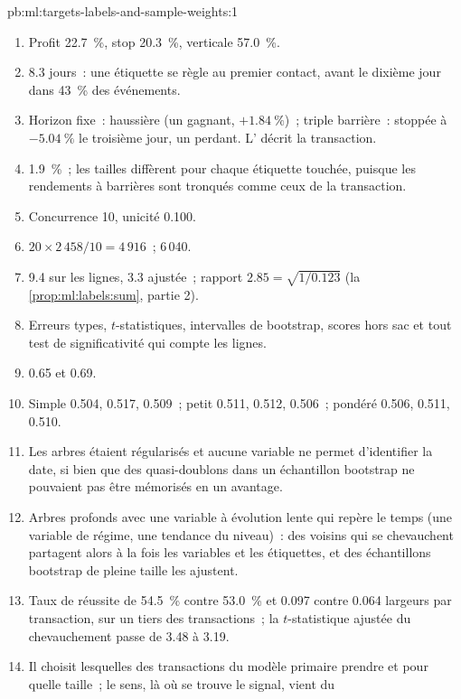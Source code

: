 \begin{solution}{pb:ml:targets-labels-and-sample-weights:1}
\begin{enumerate}
\item Profit 22.7~\%, stop 20.3~\%, verticale 57.0~\%.
\item 8.3 jours~: une étiquette se règle au premier contact, avant le dixième jour dans 43~\% des événements.
\item Horizon fixe~: haussière (un gagnant, $+1.84~\%$)~; triple barrière~: stoppée à $-5.04~\%$ le troisième jour, un perdant. L'
décrit la transaction.
\item 1.9~\%~; les tailles diffèrent pour chaque étiquette touchée, puisque les rendements à barrières sont tronqués comme ceux de la transaction.
\item Concurrence 10, unicité 0.100.
\item $20\times2\,458/10 = 4\,916$~;  6\,040.
\item 9.4 sur les lignes, 3.3 ajustée~; rapport $2.85 = \sqrt{1/0.123}$ (la \cref{prop:ml:labels:sum}, partie 2).
\item Erreurs types, $t$-statistiques, intervalles de bootstrap, scores hors sac et tout test de significativité qui compte
les lignes.
\item 0.65 et 0.69.
\item Simple 0.504, 0.517, 0.509~; petit 0.511, 0.512, 0.506~; pondéré 0.506, 0.511, 0.510.
\item Les arbres étaient régularisés et aucune variable ne permet d'identifier la date, si bien que des quasi-doublons dans un échantillon bootstrap
ne pouvaient pas être mémorisés en un avantage.
\item Arbres profonds avec une variable à évolution lente qui repère le temps (une variable de régime, une tendance du niveau)~: des voisins qui se chevauchent
partagent alors à la fois les variables et les étiquettes, et des échantillons bootstrap de pleine taille les ajustent.
\item Taux de réussite de 54.5~\% contre 53.0~\% et 0.097 contre 0.064 largeurs par transaction, sur un tiers des transactions~; la
$t$-statistique ajustée du chevauchement passe de 3.48 à 3.19.
\item Il choisit lesquelles des transactions du modèle primaire prendre et pour quelle taille~; le sens, là où se trouve le signal, vient du

\end{enumerate}
\end{solution}
